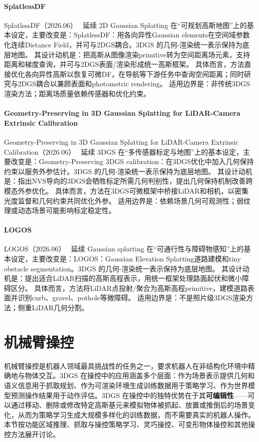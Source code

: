 \paragraph{SplatlessDF}
SplatlessDF（2026.06）~\cite{2606_13990} 延续 2D Gaussian Splatting 在“可规划高斯地图”上的基本设定，主要改变是：SplatlessDF：用各向异性Gaussian elements在空间域参数化连续Distance Field，并可与2DGS耦合。3DGS 的几何-渲染统一表示保持为底层地图。
其设计动机是：把高斯从图像渲染primitive转为空间距离场元素，支持距离和梯度查询，并可与2DGS表面/渲染形成统一高斯框架。
具体而言，方法直接优化各向异性高斯以恢复可微DF，在导航等下游任务中查询空间距离；同时研究与2DGS耦合以兼顾表面和photometric rendering。
适用边界是：非传统3DGS渲染方法；距离场质量依赖传感器和优化约束。

\paragraph{Geometry-Preserving in 3D Gaussian Splatting for LiDAR-Camera Extrinsic Calibration}
Geometry-Preserving in 3D Gaussian Splatting for LiDAR-Camera Extrinsic Calibration（2026.06）~\cite{2606_20103} 延续 3DGS 在“多传感器标定与地图”上的基本设定，主要改变是：Geometry-Preserving 3DGS calibration：在3DGS优化中加入几何保持约束以服务外参估计。3DGS 的几何-渲染统一表示保持为底层地图。
其设计动机是：指出NVS导向的3DGS会牺牲标定所需几何判别性，提出几何保持机制改善跨模态外参优化。
具体而言，方法在3DGS可微框架中桥接LiDAR和相机，以密集光度监督和几何约束共同优化外参。
适用边界是：依赖场景几何可观测性；弱纹理或动态场景可能影响标定稳定性。

\paragraph{LOGOS}
LOGOS（2026.06）~\cite{2606_21527} 延续 Gaussian splatting 在“可通行性与障碍物感知”上的基本设定，主要改变是：LOGOS：Gaussian Elevation Splatting道路建模和tiny obstacle segmentation。3DGS 的几何-渲染统一表示保持为底层地图。
其设计动机是：提出适合LiDAR扫描的高斯高程表示，用统一框架处理路面起伏和微小障碍区分。
具体而言，方法将LiDAR点投射/聚合为高斯高程primitive，建模道路表面并识别curb、gravel、pothole等微障碍。
适用边界是：不是照片级3DGS渲染方法；侧重LiDAR几何分割。
\section{机械臂操控}
\label{sec:17_2}

机械臂操控是机器人领域最具挑战性的任务之一，要求机器人在非结构化环境中精确地与物体交互。3DGS 在操控中的应用涵盖多个层面：作为场景表示提供几何和语义信息用于抓取规划、作为可渲染环境生成训练数据用于策略学习、作为世界模型预测操作结果用于动作评估。3DGS 在操控中的独特优势在于其\textbf{可编辑性}——可以通过移动、删除或修改特定高斯基元来模拟物体被抓起、放置或推倒后的场景变化，从而为策略学习生成大规模多样化的训练数据，而不需要真实的机器人操作。本节按功能区域推理、抓取与操控策略学习、灵巧操控、可变形物体操控和其他操控方法展开讨论。

